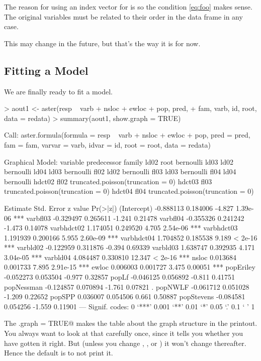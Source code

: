 \documentclass[11pt]{article}
\begin{document}
The reason for using an index vector for \verb@pred@ is so the condition
\eqref{eq:foo} makes sense.  The original variables must be related to
their order in the data frame \verb@redata@ in any case.

This may change in the future, but that's the way it is for now.

\subsection{Fitting a Model}

We are finally ready to fit a model.
\begin{Schunk}
\begin{Sinput}
> aout1 <- aster(resp ~ varb + nsloc + ewloc + pop, pred, 
+     fam, varb, id, root, data = redata)
> summary(aout1, show.graph = TRUE)
\end{Sinput}
\begin{Soutput}
Call:
aster.formula(formula = resp ~ varb + nsloc + ewloc + pop, pred = pred, 
    fam = fam, varvar = varb, idvar = id, root = root, data = redata)


Graphical Model:
 variable predecessor family                           
 ld02     root        bernoulli                        
 ld03     ld02        bernoulli                        
 ld04     ld03        bernoulli                        
 fl02     ld02        bernoulli                        
 fl03     ld03        bernoulli                        
 fl04     ld04        bernoulli                        
 hdct02   fl02        truncated.poisson(truncation = 0)
 hdct03   fl03        truncated.poisson(truncation = 0)
 hdct04   fl04        truncated.poisson(truncation = 0)

             Estimate Std. Error z value Pr(>|z|)    
(Intercept) -0.888113   0.184006  -4.827 1.39e-06 ***
varbfl03    -0.329497   0.265611  -1.241  0.21478    
varbfl04    -0.355326   0.241242  -1.473  0.14078    
varbhdct02   1.174051   0.249520   4.705 2.54e-06 ***
varbhdct03   1.191939   0.200166   5.955 2.60e-09 ***
varbhdct04   1.704852   0.185538   9.189  < 2e-16 ***
varbld02    -0.122959   0.311876  -0.394  0.69339    
varbld03     1.638747   0.392935   4.171 3.04e-05 ***
varbld04     4.084487   0.330810  12.347  < 2e-16 ***
nsloc        0.013684   0.001733   7.895 2.91e-15 ***
ewloc        0.006003   0.001727   3.475  0.00051 ***
popEriley   -0.052273   0.053504  -0.977  0.32857    
popLf       -0.046125   0.056892  -0.811  0.41751    
popNessman  -0.124857   0.070894  -1.761  0.07821 .  
popNWLF     -0.061712   0.051028  -1.209  0.22652    
popSPP       0.036007   0.054506   0.661  0.50887    
popStevens  -0.084581   0.054256  -1.559  0.11901    
---
Signif. codes:  0 ‘***’ 0.001 ‘**’ 0.01 ‘*’ 0.05 ‘.’ 0.1 ‘ ’ 1 
\end{Soutput}
\end{Schunk}
The \verb@show.graph = TRUE@ makes the table about the graph structure
in the printout.  You always want to look at that carefully once, since
it tells you whether you have gotten it right.  But (unless you change
\verb@redata@, \verb@pred@, or \verb@fam@) it won't change thereafter.
Hence the default is to not print it.
\end{document}
